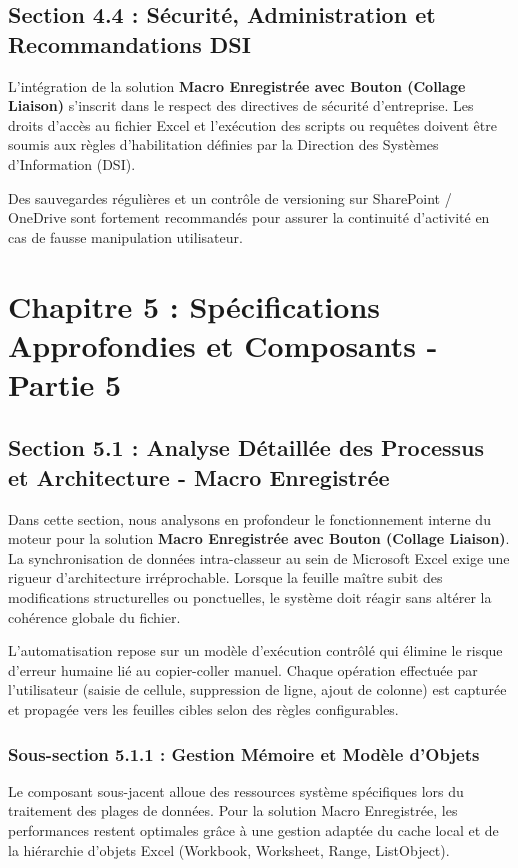 \documentclass[12pt,a4paper]{report}
\begin{document}
\section{Section 4.4 : Sécurité, Administration et Recommandations DSI}
L'intégration de la solution \textbf{Macro Enregistrée avec Bouton (Collage Liaison)} s'inscrit dans le respect des directives de sécurité d'entreprise. Les droits d'accès au fichier Excel et l'exécution des scripts ou requêtes doivent être soumis aux règles d'habilitation définies par la Direction des Systèmes d'Information (DSI).

Des sauvegardes régulières et un contrôle de versioning sur SharePoint / OneDrive sont fortement recommandés pour assurer la continuité d'activité en cas de fausse manipulation utilisateur.


\chapter{Chapitre 5 : Spécifications Approfondies et Composants - Partie 5}

\section{Section 5.1 : Analyse Détaillée des Processus et Architecture - Macro Enregistrée}
Dans cette section, nous analysons en profondeur le fonctionnement interne du moteur pour la solution \textbf{Macro Enregistrée avec Bouton (Collage Liaison)}. La synchronisation de données intra-classeur au sein de Microsoft Excel exige une rigueur d'architecture irréprochable. Lorsque la feuille maître subit des modifications structurelles ou ponctuelles, le système doit réagir sans altérer la cohérence globale du fichier.

L'automatisation repose sur un modèle d'exécution contrôlé qui élimine le risque d'erreur humaine lié au copier-coller manuel. Chaque opération effectuée par l'utilisateur (saisie de cellule, suppression de ligne, ajout de colonne) est capturée et propagée vers les feuilles cibles selon des règles configurables.


\subsection{Sous-section 5.1.1 : Gestion Mémoire et Modèle d'Objets}
Le composant sous-jacent alloue des ressources système spécifiques lors du traitement des plages de données. Pour la solution Macro Enregistrée, les performances restent optimales grâce à une gestion adaptée du cache local et de la hiérarchie d'objets Excel (Workbook, Worksheet, Range, ListObject).
\end{document}
